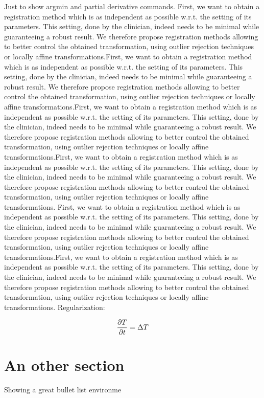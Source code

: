 Just to show argmin and partial derivative commands.
First, we want to obtain a registration method which is as independent as possible w.r.t. the setting of its parameters. This setting, done by the clinician, indeed needs to be minimal while guaranteeing a robust result. We therefore propose registration methods allowing to better control the obtained transformation, using outlier rejection techniques or locally affine transformations.First, we want to obtain a registration method which is as independent as possible w.r.t. the setting of its parameters. This setting, done by the clinician, indeed needs to be minimal while guaranteeing a robust result. We therefore propose registration methods allowing to better control the obtained transformation, using outlier rejection techniques or locally affine transformations.First, we want to obtain a registration method which is as independent as possible w.r.t. the setting of its parameters. This setting, done by the clinician, indeed needs to be minimal while guaranteeing a robust result. We therefore propose registration methods allowing to better control the obtained transformation, using outlier rejection techniques or locally affine transformations.First, we want to obtain a registration method which is as independent as possible w.r.t. the setting of its parameters. This setting, done by the clinician, indeed needs to be minimal while guaranteeing a robust result. We therefore propose registration methods allowing to better control the obtained transformation, using outlier rejection techniques or locally affine transformations.
First, we want to obtain a registration method which is as independent as possible w.r.t. the setting of its parameters. This setting, done by the clinician, indeed needs to be minimal while guaranteeing a robust result. We therefore propose registration methods allowing to better control the obtained transformation, using outlier rejection techniques or locally affine transformations.First, we want to obtain a registration method which is as independent as possible w.r.t. the setting of its parameters. This setting, done by the clinician, indeed needs to be minimal while guaranteeing a robust result. We therefore propose registration methods allowing to better control the obtained transformation, using outlier rejection techniques or locally affine transformations.
Regularization:

\begin{equation}
  \frac{\partial T}{\partial t} = \Delta T
\end{equation}

\section{An other section}

Showing a great bullet list environme